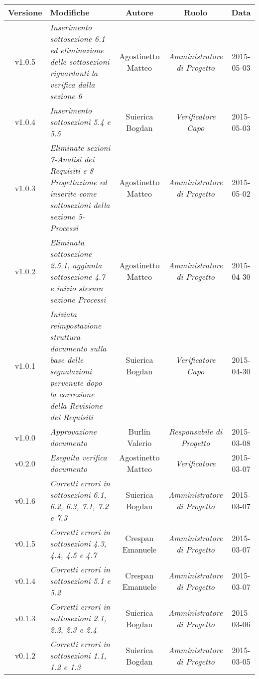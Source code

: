 \newpage
\begin{table}[h]
\centering
\begin{tabular}{|c|p{}|c|c|c|}
	\toprule
	\textbf{Versione} & \textbf{Modifiche} & \textbf{Autore} & \textbf{Ruolo} & \textbf{Data} \\
	\midrule
	\midrule
		v1.0.5 & \textit{Inserimento sottosezione 6.1 ed eliminazione delle sottosezioni riguardanti la verifica dalla sezione 6} & Agostinetto Matteo & \textit{Amministratore di Progetto} & 2015-05-03\\
	\midrule
		v1.0.4 & \textit{Inserimento sottosezioni 5.4 e 5.5} & Suierica Bogdan & \textit{Verificatore Capo} & 2015-05-03\\
	\midrule
		v1.0.3 & \textit{Eliminate sezioni 7-Analisi dei Requisiti e 8-Progettazione ed inserite come sottosezioni della sezione 5-Processi} & Agostinetto Matteo & \textit{Amministratore di Progetto} & 2015-05-02\\
	\midrule
		v1.0.2 & \textit{Eliminata sottosezione 2.5.1, aggiunta sottosezione 4.7 e inizio stesura sezione Processi} & Agostinetto Matteo & \textit{Amministratore di Progetto} & 2015-04-30\\
	\midrule
		v1.0.1 & \textit{Iniziata reimpostazione struttura documento sulla base delle segnalazioni pervenute dopo la correzione della Revisione dei Requisiti} & Suierica Bogdan & \textit{Verificatore Capo} & 2015-04-30\\
	\midrule
		v1.0.0 & \textit{Approvazione documento} & Burlin Valerio & \textit{Responsabile di Progetto} & 2015-03-08\\
	\midrule
		v0.2.0 & \textit{Eseguita verifica documento} & Agostinetto Matteo & \textit{Verificatore} & 2015-03-07\\
	\midrule
		v0.1.6 & \textit{Corretti errori in sottosezioni 6.1, 6.2, 6.3, 7.1, 7.2 e 7.3} & Suierica Bogdan & \textit{Amministratore di Progetto} & 2015-03-07\\
	\midrule
		v0.1.5 & \textit{Corretti errori in sottosezioni 4.3, 4.4, 4.5 e 4.7} & Crespan Emanuele & \textit{Amministratore di Progetto} & 2015-03-07\\
	\midrule
		v0.1.4 & \textit{Corretti errori in sottosezioni 5.1 e 5.2} & Crespan Emanuele & \textit{Amministratore di Progetto} & 2015-03-07\\
	\midrule
		v0.1.3 & \textit{Corretti errori in sottosezioni 2.1, 2.2, 2.3 e 2.4} & Suierica Bogdan & \textit{Amministratore di Progetto} & 2015-03-06\\
	\midrule
		v0.1.2 & \textit{Corretti errori in sottosezioni 1.1, 1.2 e 1.3} & Suierica Bogdan & \textit{Amministratore di Progetto} & 2015-03-05\\
	\bottomrule
\end{tabular}
\end{table}
